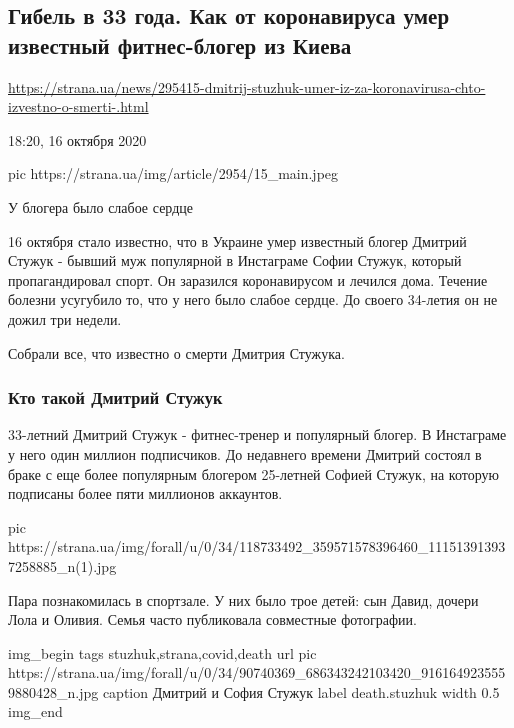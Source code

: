  
 

\subsection{Гибель в 33 года. Как от коронавируса умер известный фитнес-блогер из Киева}

\url{https://strana.ua/news/295415-dmitrij-stuzhuk-umer-iz-za-koronavirusa-chto-izvestno-o-smerti-.html}

18:20, 16 октября 2020 

\ifcmt
pic https://strana.ua/img/article/2954/15_main.jpeg
\fi

У блогера было слабое сердце

16 октября стало известно, что в Украине умер известный блогер Дмитрий Стужук -
бывший муж популярной в Инстаграме Софии Стужук, который пропагандировал спорт.
Он заразился коронавирусом и лечился дома. Течение болезни усугубило то, что у
него было слабое сердце. До своего 34-летия он не дожил три недели.

Собрали все, что известно о смерти Дмитрия Стужука.

\subsubsection{Кто такой Дмитрий Стужук}

33-летний Дмитрий Стужук - фитнес-тренер и популярный блогер. В Инстаграме у
него один миллион подписчиков. До недавнего времени Дмитрий состоял в браке с
еще более популярным блогером 25-летней Софией Стужук, на которую подписаны
более пяти миллионов аккаунтов.

\ifcmt
pic https://strana.ua/img/forall/u/0/34/118733492_359571578396460_111513913937258885_n(1).jpg
\fi

Пара познакомилась в спортзале. У них было трое детей: сын Давид, дочери Лола и
Оливия. Семья часто публиковала совместные фотографии.

\ifcmt
img_begin 
	tags stuzhuk,strana,covid,death
	url pic https://strana.ua/img/forall/u/0/34/90740369_686343242103420_9161649235559880428_n.jpg
	caption Дмитрий и София Стужук
	label death.stuzhuk
	width 0.5
img_end
\fi

